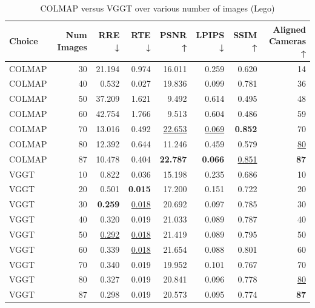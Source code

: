 \begin{table}[H]
\caption{\ifdefined\customcaption \customcaption \else COLMAP versus VGGT over various number of images (Lego) \fi}
\label{tab:01_num_images_brief_lego}
\centering
\scriptsize
\begin{tabular}{lrrrrrrr}
\toprule
Choice & Num Images & RRE ↓ & RTE ↓ & PSNR ↑ & LPIPS ↓ & SSIM ↑ & Aligned Cameras ↑ \\
\midrule
COLMAP & 30 & 21.194 & 0.974 & 16.011 & 0.259 & 0.620 & 14 \\
COLMAP & 40 & 0.532 & 0.027 & 19.836 & 0.099 & 0.781 & 36 \\
COLMAP & 50 & 37.209 & 1.621 & 9.492 & 0.614 & 0.495 & 48 \\
COLMAP & 60 & 42.754 & 1.766 & 9.513 & 0.604 & 0.486 & 59 \\
COLMAP & 70 & 13.016 & 0.492 & \underline{22.653} & \underline{0.069} & \textbf{0.852} & 70 \\
COLMAP & 80 & 12.392 & 0.644 & 11.246 & 0.459 & 0.579 & \underline{80} \\
COLMAP & 87 & 10.478 & 0.404 & \textbf{22.787} & \textbf{0.066} & \underline{0.851} & \textbf{87} \\
VGGT & 10 & 0.822 & 0.036 & 15.198 & 0.235 & 0.686 & 10 \\
VGGT & 20 & 0.501 & \textbf{0.015} & 17.200 & 0.151 & 0.722 & 20 \\
VGGT & 30 & \textbf{0.259} & \underline{0.018} & 20.692 & 0.097 & 0.785 & 30 \\
VGGT & 40 & 0.320 & 0.019 & 21.033 & 0.089 & 0.787 & 40 \\
VGGT & 50 & \underline{0.292} & \underline{0.018} & 21.419 & 0.089 & 0.795 & 50 \\
VGGT & 60 & 0.339 & \underline{0.018} & 21.654 & 0.088 & 0.801 & 60 \\
VGGT & 70 & 0.340 & 0.019 & 19.952 & 0.101 & 0.767 & 70 \\
VGGT & 80 & 0.327 & 0.019 & 20.841 & 0.096 & 0.778 & \underline{80} \\
VGGT & 87 & 0.298 & 0.019 & 20.573 & 0.095 & 0.774 & \textbf{87} \\
\bottomrule
\end{tabular}
\end{table}